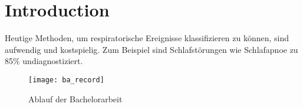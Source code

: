 
\chapter{Introduction}
\label{ch:Introduction}

Heutige Methoden, um respiratorische Ereignisse klassifizieren zu können, sind aufwendig und kostspielig. 
Zum Beispiel sind Schlafstörungen wie Schlafapnoe zu 85\% undiagnostiziert.

\begin{figure}[ht]
    \centering
    \texttt{[image: ba\_record]}
    \caption{Ablauf der Bachelorarbeit}
    \label{introduction:ba_record}
  \end{figure}